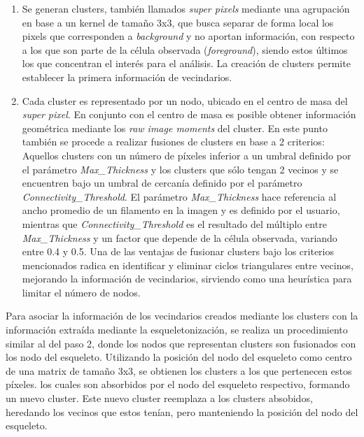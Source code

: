 \begin{enumerate}
    \item Se generan clusters, tambi\'en llamados {\it super pixels} mediante una agrupaci\'on en base a un kernel de tama\~no 3x3, que busca separar de forma local los pixels que corresponden a {\it background} y no aportan informaci\'on, con respecto a los que son parte de la c\'elula observada ({\it foreground}), siendo estos \'ultimos los que concentran el inter\'es para el an\'alisis. La creaci\'on de clusters permite establecer la primera informaci\'on de vecindarios.
    \item Cada cluster es representado por un nodo, ubicado en el centro de masa del {\it super pixel}. En conjunto con el centro de masa es posible obtener informaci\'on geom\'etrica mediante los {\it raw image moments}\cite{chaumette2004image} del cluster. En este punto tambi\'en se procede a realizar fusiones de clusters en base a 2 criterios: Aquellos clusters con un n\'umero de p\'ixeles inferior a un umbral definido por el par\'ametro {\it Max\_Thickness} y los clusters que s\'olo tengan 2 vecinos y se encuentren bajo un umbral de cercan\'ia definido por el par\'ametro {\it Connectivity\_Threshold}. El par\'ametro {\it Max\_Thickness} hace referencia al ancho promedio de un filamento en la imagen y es definido por el usuario, mientras que {\it Connectivity\_Threshold} es el resultado del m\'ultiplo entre {\it Max\_Thickness} y un factor que depende de la c\'elula observada, variando entre 0.4 y 0.5. Una de las ventajas de fusionar clusters bajo los criterios mencionados radica en identificar y eliminar ciclos triangulares entre vecinos, mejorando la informaci\'on de vecindarios, sirviendo como una heurística para limitar el n\'umero de nodos.
    
\end{enumerate}

Para asociar la informaci\'on de los vecindarios creados mediante los clusters con la informaci\'on extra\'ida mediante la esqueletonizaci\'on, se realiza un procedimiento similar al del paso 2, donde los nodos que representan clusters son fusionados con los nodo del esqueleto. 
Utilizando la posici\'on del nodo del esqueleto como centro de una matrix de tama\~no 3x3, se obtienen los clusters a los que pertenecen estos p\'ixeles. los cuales son absorbidos por el nodo del esqueleto respectivo, formando un nuevo cluster. Este nuevo cluster reemplaza a los clusters absobidos, heredando los vecinos que estos ten\'ian, pero manteniendo la posici\'on del nodo del esqueleto.


